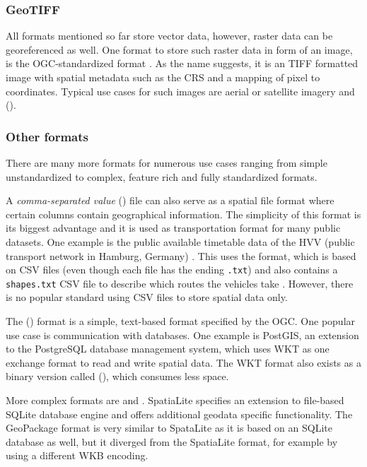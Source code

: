 		\subsubsection{GeoTIFF}
		
			All formats mentioned so far store vector data, however, raster data can be georeferenced as well.
			One format to store such raster data in form of an image, is the OGC-standardized  format \cite{ogc-geotiff}.
			As the name suggests, it is an TIFF formatted image with spatial metadata such as the CRS and a mapping of pixel to coordinates.
			Typical use cases for such images are aerial or satellite imagery and  ().
		
		\subsubsection{Other formats}
		
			There are many more formats for numerous use cases ranging from simple unstandardized to complex, feature rich and fully standardized formats.
			
			A \emph{comma-separated value} () file can also serve as a spatial file format where certain columns contain geographical information.
			The simplicity of this format is its biggest advantage and it is used as transportation format for many public datasets.
			One example is the public available timetable data of the HVV (public transport network in Hamburg, Germany) \cite{hvv-fahrplandaten}.
			This uses the  format, which is based on CSV files (even though each file has the ending \texttt{.txt}) and also contains a \texttt{shapes.txt} CSV file to describe which routes the vehicles take \cite{google-gtfs}.
			However, there is no popular standard using CSV files to store spatial data only.
			
			The  () format is a simple, text-based format specified by the OGC\cite[51]{ogc-sfa}.
			One popular use case is communication with databases.
			One example is PostGIS, an extension to the PostgreSQL database management system, which uses WKT as one exchange format to read and write spatial data\cite{postgis-doc-wkt}.
			The WKT format also exists as a binary version called  (), which consumes less space.
			
			More complex formats are  and .
			SpatiaLite specifies an extension to file-based SQLite database engine and offers additional geodata specific functionality\cite{spatialite-website}.
			The GeoPackage format is very similar to SpataLite as it is based on an SQLite database as well, but it diverged from the SpatiaLite format, for example by using a different WKB encoding\cite{geopackage-faq}.
			
